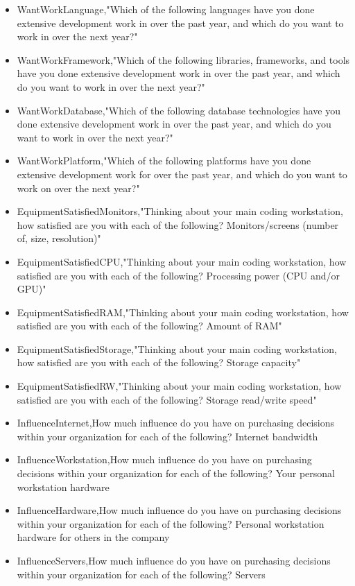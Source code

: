 \begin{appendices}
\begin{itemize}
        \item WantWorkLanguage,"Which of the following languages have you done extensive development work in over the past year, and which do you want to work in over the next year?"
        \item WantWorkFramework,"Which of the following libraries, frameworks, and tools have you done extensive development work in over the past year, and which do you want to work in over the next year?"
        \item WantWorkDatabase,"Which of the following database technologies have you done extensive development work in over the past year, and which do you want to work in over the next year?"
        \item WantWorkPlatform,"Which of the following platforms have you done extensive development work for over the past year, and which do you want to work on over the next year?"
        \item EquipmentSatisfiedMonitors,"Thinking about your main coding workstation, how satisfied are you with each of the following? Monitors/screens (number of, size, resolution)"
        \item EquipmentSatisfiedCPU,"Thinking about your main coding workstation, how satisfied are you with each of the following? Processing power (CPU and/or GPU)"
        \item EquipmentSatisfiedRAM,"Thinking about your main coding workstation, how satisfied are you with each of the following? Amount of RAM"
        \item EquipmentSatisfiedStorage,"Thinking about your main coding workstation, how satisfied are you with each of the following? Storage capacity"
        \item EquipmentSatisfiedRW,"Thinking about your main coding workstation, how satisfied are you with each of the following? Storage read/write speed"
        \item InfluenceInternet,How much influence do you have on purchasing decisions within your organization for each of the following? Internet bandwidth
        \item InfluenceWorkstation,How much influence do you have on purchasing decisions within your organization for each of the following? Your personal workstation hardware
        \item InfluenceHardware,How much influence do you have on purchasing decisions within your organization for each of the following? Personal workstation hardware for others in the company
        \item InfluenceServers,How much influence do you have on purchasing decisions within your organization for each of the following? Servers

\end{itemize}
\end{appendices}
